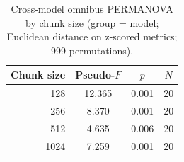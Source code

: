 \begin{table}[H]
\centering
\caption{Cross-model omnibus PERMANOVA by chunk size (group = model; Euclidean distance on z-scored metrics; 999 permutations).}
\label{tab:cross-permanova-omnibus}
\begin{tabular}{rccc}
\toprule
Chunk size & Pseudo-$F$ & $p$ & $N$ \\
\midrule
128 & 12.365 & 0.001 & 20 \\
256 & 8.370 & 0.001 & 20 \\
512 & 4.635 & 0.006 & 20 \\
1024 & 7.259 & 0.001 & 20 \\
\bottomrule
\end{tabular}
\end{table}
